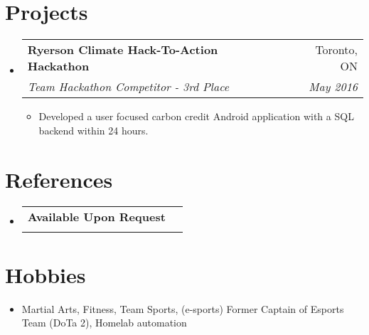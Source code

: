 \documentclass[letterpaper,11pt]{article}
\makeatletter
\newcommand{\resumeItem}[2]{
  \item\small{
    \textbf{#1}{#2 \vspace{-2pt}}
  }
}
\newcommand{\resumeSubheading}[4]{
  \vspace{-1pt}\item
    \begin{tabular*}{0.97\textwidth}[t]{l@{\extracolsep{\fill}}r}
      \textbf{#1} & #2 \\
      \textit{\small#3} & \textit{\small #4} \\
    \end{tabular*}\vspace{-5pt}
}
\newcommand{\resumeSubSubheading}[2]{
    \begin{tabular*}{0.97\textwidth}{l@{\extracolsep{\fill}}r}
      \textit{\small#1} & \textit{\small #2} \\
    \end{tabular*}\vspace{-5pt}
}
\newcommand{\resumeSubHeadingListStart}{\begin{itemize}[leftmargin=*]}
\newcommand{\resumeSubHeadingListEnd}{\end{itemize}}
\newcommand{\resumeItemListStart}{\begin{itemize}}
\newcommand{\resumeItemListEnd}{\end{itemize}\vspace{-5pt}}
\makeatother
\begin{document}
      


\section{Projects}
  \resumeSubHeadingListStart
	\resumeSubheading
	{Ryerson Climate Hack-To-Action Hackathon}{Toronto, ON}
	{Team Hackathon Competitor - 3rd Place }{May 2016}
		\resumeItemListStart
			\resumeItem{}
			{Developed a user focused carbon credit Android application with a SQL backend within 24 hours.}
		\resumeItemListEnd
  \resumeSubHeadingListEnd

\section{References}
	\resumeSubHeadingListStart
		\resumeSubheading
		{Available Upon Request}{}{}{}
	\resumeSubHeadingListEnd


%

\section{Hobbies}
	\resumeSubHeadingListStart
	\item{
	\textbf{}{Martial Arts, Fitness, Team Sports, (e-sports) Former Captain of Esports Team (DoTa 2), Homelab automation }
	}
	\resumeSubHeadingListEnd
\end{document}
